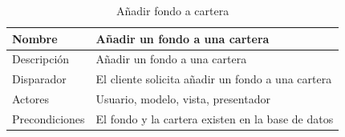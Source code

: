 \documentclass[12pt, a4paper]{book}
\begin{document}
\begin{table}[htbp]
	\centering
	\caption{Añadir fondo a cartera}
	\label{my-label}
	\begin{tabular}{|l|l|}
		\hline
		Nombre            & Añadir un fondo a una cartera                                                                                                                                                                                                                                                                                                                                                                                   \\ \hline
		Descripción       & Añadir un fondo a una cartera                                                                                                                                                                                                                                                                                                                                                                                   \\ \hline
		Disparador        & El cliente solicita añadir un fondo a una cartera                                                                                                                                                                                                                                                                                                                                                               \\ \hline
		Actores           & Usuario, modelo, vista, presentador                                                                                                                                                                                                                                                                                                                                                                             \\ \hline
		Precondiciones    & El fondo y la cartera existen en la base de datos                                                                                                                                                                                                                                                                                                                                                               \\ \hline

\end{tabular}
\end{table}
\end{document}
